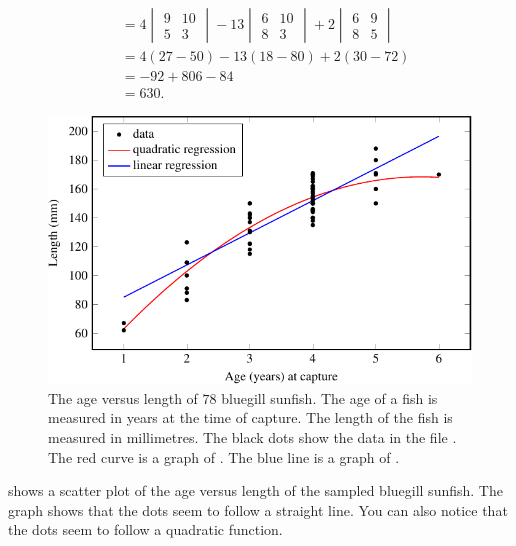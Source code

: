 \documentclass[a4paper,oneside,12pt]{article}
\begin{document}
\begin{problem}
{\begin{solution}
\begin{align*}
&=
4
\begin{vmatrix}
9  & 10 \\
5  & 3
\end{vmatrix}
-
13
\begin{vmatrix}
6  & 10 \\
8  & 3
\end{vmatrix}
+
2
\begin{vmatrix}
6  & 9 \\
8  & 5
\end{vmatrix} \\[4pt]
&=
4(27 - 50) - 13(18 - 80) + 2(30 - 72) \\[4pt]
&=
-92 + 806 - 84 \\[4pt]
&=
630.
\end{align*}

\begin{figure}[!htbp]
\centering
\includegraphics[scale=1.1]{image/09/bluegill.pdf}
\caption{%
  The age versus length of $78$ bluegill sunfish.  The age of a fish
  is measured in years at the time of capture.  The length of the fish
  is measured in millimetres.  The black dots show the data in the
  file .  The red curve is a graph of
  .  The blue
  line is a graph of
  .
}
\label{fig:quadratic_applications:bluegill}
\end{figure}

 shows a scatter plot of
the age versus length of the sampled bluegill sunfish.  The graph
shows that the dots seem to follow a straight line.  You can also
notice that the dots seem to follow a quadratic function.


\end{solution}}
\end{problem}
\end{document}
